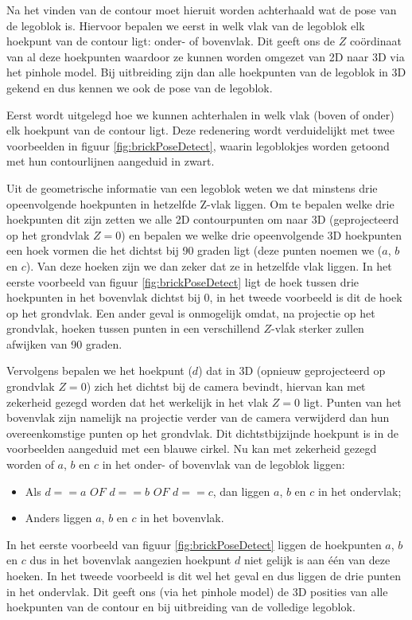 Na het vinden van de contour moet hieruit worden achterhaald wat de pose van de legoblok is. Hiervoor bepalen we eerst in welk vlak van de legoblok elk hoekpunt van de contour ligt: onder- of bovenvlak. Dit geeft ons de $Z$ co\"ordinaat van al deze hoekpunten waardoor ze kunnen worden omgezet van 2D naar 3D via het pinhole model. Bij uitbreiding zijn dan alle hoekpunten van de legoblok in 3D gekend en dus kennen we ook de pose van de legoblok.

Eerst wordt uitgelegd hoe we kunnen achterhalen in welk vlak (boven of onder) elk hoekpunt van de contour ligt. Deze redenering wordt verduidelijkt met twee voorbeelden in figuur \ref{fig:brickPoseDetect}, waarin legoblokjes worden getoond met hun contourlijnen aangeduid in zwart.

Uit de geometrische informatie van een legoblok weten we dat minstens drie opeenvolgende hoekpunten in hetzelfde Z-vlak liggen. Om te bepalen welke drie hoekpunten dit zijn zetten we alle 2D contourpunten om naar 3D (geprojecteerd op het grondvlak $Z = 0$) en bepalen we welke drie opeenvolgende 3D hoekpunten een hoek vormen die het dichtst bij 90 graden ligt (deze punten noemen we ($a$, $b$ en $c$). Van deze hoeken zijn we dan zeker dat ze in hetzelfde vlak liggen. In het eerste voorbeeld van figuur \ref{fig:brickPoseDetect} ligt de hoek tussen drie hoekpunten in het bovenvlak dichtst bij 0, in het tweede voorbeeld is dit de hoek op het grondvlak. Een ander geval is onmogelijk omdat, na projectie op het grondvlak, hoeken tussen punten in een verschillend $Z$-vlak sterker zullen afwijken van 90 graden.

Vervolgens bepalen we het hoekpunt ($d$) dat in 3D (opnieuw geprojecteerd op grondvlak $Z = 0$) zich het dichtst bij de camera bevindt, hiervan kan met zekerheid gezegd worden dat het werkelijk in het vlak $Z = 0$ ligt. Punten van het bovenvlak zijn namelijk na projectie verder van de camera verwijderd dan hun overeenkomstige punten op het grondvlak. Dit dichtstbijzijnde hoekpunt is in de voorbeelden aangeduid met een blauwe cirkel. Nu kan met zekerheid gezegd worden of $a$, $b$ en $c$ in het onder- of bovenvlak van de legoblok liggen: 
\begin{itemize}
\item Als $d == a$ $OF$ $d == b$ $OF$ $d == c$, dan liggen $a$, $b$ en $c$ in het ondervlak;
\item Anders liggen $a$, $b$ en $c$ in het bovenvlak.
\end{itemize}
In het eerste voorbeeld van figuur \ref{fig:brickPoseDetect} liggen de hoekpunten $a$, $b$ en $c$ dus in het bovenvlak aangezien hoekpunt $d$ niet gelijk is aan \'e\'en van deze hoeken. In het tweede voorbeeld is dit wel het geval en dus liggen de drie punten in het ondervlak. Dit geeft ons (via het pinhole model) de 3D posities van alle hoekpunten van de contour en bij uitbreiding van de volledige legoblok.


